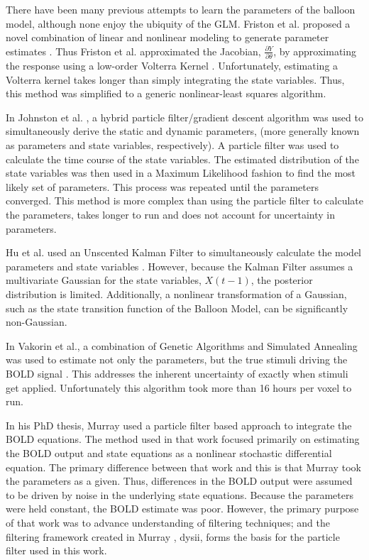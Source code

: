 \documentclass{article}
\begin{document}
There have been many previous attempts to learn the parameters of the
balloon model, although none enjoy the ubiquity of the \ac{GLM}. 
Friston et al. proposed a novel combination of 
linear and nonlinear modeling to generate parameter estimates
\cite{Friston2002b}.  Thus Friston et al. approximated the Jacobian, 
$\frac{\partial Y}{\partial \theta}$, by approximating the response
using a low-order Volterra Kernel \cite{Friston2002b}. 
Unfortunately, estimating a Volterra kernel
takes longer than simply integrating the state variables. Thus,
this method was simplified to a generic nonlinear-least squares algorithm.

In Johnston et al. \cite{Johnston2007}, a hybrid particle filter/gradient
descent algorithm was used to simultaneously derive the static and dynamic 
parameters, (more generally known as parameters and state variables, respectively).
A particle filter was used to calculate the time course of the state variables.
The estimated distribution of the state variables was then used in
a Maximum Likelihood fashion to find the most likely set of parameters. 
This process was repeated until the parameters converged. This
method is  more complex than using the particle
filter to calculate the parameters, takes longer to run and
does not account for uncertainty in parameters.

Hu et al. used an Unscented Kalman Filter to simultaneously calculate
the model parameters and state variables \cite{Hu2009}.
However, because the Kalman Filter assumes a multivariate 
Gaussian for the state variables, $X(t-1)$, the posterior 
distribution is limited. Additionally, a nonlinear transformation of 
a Gaussian, 
such as the state transition function of the Balloon Model,
can be significantly non-Gaussian. 

In Vakorin et al., a combination of Genetic Algorithms and 
Simulated Annealing was used to estimate not only the parameters, but the true 
stimuli driving the \ac{BOLD} signal  \cite{Vakorin2007}. 
This addresses the inherent uncertainty of exactly when 
stimuli get applied. Unfortunately this algorithm took
more than 16 hours per voxel to run.

In his PhD thesis, Murray \cite{Murray2008} used a particle filter based 
approach to integrate
the \ac{BOLD} equations. The method used in that work focused primarily on estimating
the \ac{BOLD} output and state equations as a nonlinear stochastic differential 
equation. The primary difference between that work and this is that
Murray \cite{Murray2008} took the parameters as a given. Thus, differences in the \ac{BOLD} output
were assumed to be driven by noise in the underlying state
equations. Because the parameters were held constant, the 
\ac{BOLD} estimate was poor. However, the primary purpose of that work
was to advance understanding of filtering techniques; and the filtering framework created
in Murray \cite{Murray2008}, dysii, forms the basis for the particle 
filter used in this work.
\end{document}
